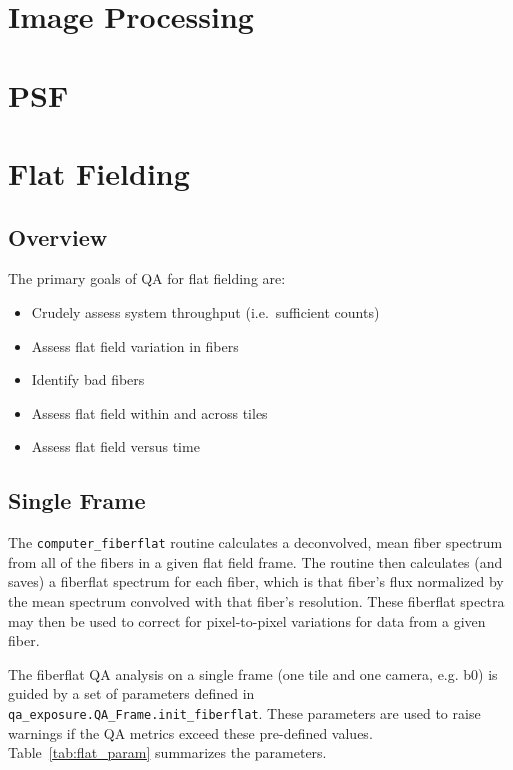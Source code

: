 \documentclass[12pt]{article}
\newenvironment{myitemize}
{ \begin{itemize}
    \setlength{\itemsep}{0pt}
    \setlength{\parskip}{0pt}
    \setlength{\parsep}{0pt}     }
{ \end{itemize}                  }
\begin{document}
\section{Image Processing}

\section{PSF}

\section{Flat Fielding}

\subsection{Overview}

The primary goals of QA for flat fielding are:

\begin{myitemize}
\item Crudely assess system throughput (i.e.\ sufficient counts)
\item Assess flat field variation in fibers
\item Identify bad fibers
\item Assess flat field within and across tiles
\item Assess flat field versus time
\end{myitemize}

\subsection{Single Frame}

The {\tt computer\_fiberflat} routine calculates a 
deconvolved, mean fiber spectrum from all of the fibers in a given 
flat field frame. 
The routine then calculates (and saves) a fiberflat spectrum for each 
fiber, which is that fiber's flux normalized by the mean spectrum 
convolved with that fiber's resolution.  These fiberflat spectra
may then be used to correct for pixel-to-pixel variations 
for data from a given fiber.

The fiberflat QA analysis on a single frame (one tile and one camera, e.g. b0)
is guided by a set of 
parameters defined in {\tt qa\_exposure.QA\_Frame.init\_fiberflat}.
These parameters are used 
to raise warnings if the QA metrics exceed these pre-defined values.
Table~\ref{tab:flat_param} summarizes the parameters.
\end{document}
